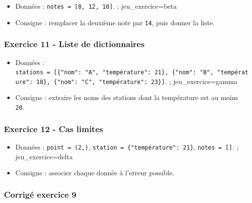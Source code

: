 \begin{itemize}
\tightlist
\item
  Données : \texttt{notes\ =\ {[}8,\ 12,\ 10{]}}. ; jeu\_exercice=beta
\item
  Consigne : remplacer la deuxième note par \texttt{14}, puis donner la
  liste.
\end{itemize}

\subsubsection{Exercice 11 - Liste de dictionnaires}

\begin{itemize}
\tightlist
\item
  Données :
  \texttt{stations\ =\ {[}\{"nom":\ "A",\ "température":\ 21\},\ \{"nom":\ "B",\ "température":\ 18\},\ \{"nom":\ "C",\ "température":\ 23\}{]}}.
  ; jeu\_exercice=gamma
\item
  Consigne : extraire les noms des stations dont la température est au
  moins \texttt{20}.
\end{itemize}

\subsubsection{Exercice 12 - Cas limites}

\begin{itemize}
\tightlist
\item
  Données : \texttt{point\ =\ (2,)},
  \texttt{station\ =\ \{"température":\ 21\}},
  \texttt{notes\ =\ {[}{]}}. ; jeu\_exercice=delta
\item
  Consigne : associer chaque donnée à l'erreur possible.
\end{itemize}

\subsubsection{Corrigé exercice 9}

